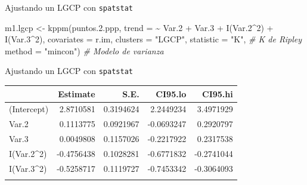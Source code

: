 \documentclass[
  11pt,
  ignorenonframetext,
]{beamer}
\newenvironment{Shaded}{}{}
\newcommand{\AttributeTok}[1]{\textcolor[rgb]{0.49,0.56,0.16}{#1}}
\newcommand{\CommentTok}[1]{\textcolor[rgb]{0.38,0.63,0.69}{\textit{#1}}}
\newcommand{\DecValTok}[1]{\textcolor[rgb]{0.25,0.63,0.44}{#1}}
\newcommand{\FloatTok}[1]{\textcolor[rgb]{0.25,0.63,0.44}{#1}}
\newcommand{\FunctionTok}[1]{\textcolor[rgb]{0.02,0.16,0.49}{#1}}
\newcommand{\NormalTok}[1]{#1}
\newcommand{\OtherTok}[1]{\textcolor[rgb]{0.00,0.44,0.13}{#1}}
\newcommand{\SpecialCharTok}[1]{\textcolor[rgb]{0.25,0.44,0.63}{#1}}
\newcommand{\StringTok}[1]{\textcolor[rgb]{0.25,0.44,0.63}{#1}}
\begin{document}
\begin{frame}[fragile]{Ajustando un LGCP con \texttt{spatstat}}
\protect\hypertarget{ajustando-un-lgcp-con-spatstat}{}
\begin{Shaded}
\begin{Highlighting}[]
\NormalTok{m1.lgcp }\OtherTok{\textless{}{-}} \FunctionTok{kppm}\NormalTok{(puntos.}\FloatTok{2.}\NormalTok{ppp,}
                \AttributeTok{trend =} \SpecialCharTok{\textasciitilde{}}\NormalTok{ Var}\FloatTok{.2} \SpecialCharTok{+}\NormalTok{ Var}\FloatTok{.3} \SpecialCharTok{+} \FunctionTok{I}\NormalTok{(Var}\FloatTok{.2}\SpecialCharTok{\^{}}\DecValTok{2}\NormalTok{) }\SpecialCharTok{+} \FunctionTok{I}\NormalTok{(Var}\FloatTok{.3}\SpecialCharTok{\^{}}\DecValTok{2}\NormalTok{),}
                \AttributeTok{covariates =}\NormalTok{ r.im,}
                \AttributeTok{clusters =} \StringTok{"LGCP"}\NormalTok{,}
                \AttributeTok{statistic =} \StringTok{"K"}\NormalTok{, }\CommentTok{\# K de Ripley}
                \AttributeTok{method =} \StringTok{"mincon"}\NormalTok{) }\CommentTok{\# Modelo de varianza}
\end{Highlighting}
\end{Shaded}
\end{frame}

\begin{frame}[fragile]{Ajustando un LGCP con \texttt{spatstat}}
\protect\hypertarget{ajustando-un-lgcp-con-spatstat-1}{}
\begin{Shaded}
\end{Shaded}

\begin{longtable}[]{@{}lrrrr@{}}
\toprule\noalign{}
& Estimate & S.E. & CI95.lo & CI95.hi \\
\midrule\noalign{}
\endhead
(Intercept) & 2.8710581 & 0.3194624 & 2.2449234 & 3.4971929 \\
Var.2 & 0.1113775 & 0.0921967 & -0.0693247 & 0.2920797 \\
Var.3 & 0.0049808 & 0.1157026 & -0.2217922 & 0.2317538 \\
I(Var.2\^{}2) & -0.4756438 & 0.1028281 & -0.6771832 & -0.2741044 \\
I(Var.3\^{}2) & -0.5258717 & 0.1119727 & -0.7453342 & -0.3064093 \\
\bottomrule\noalign{}
\end{longtable}
\end{frame}
\end{document}
